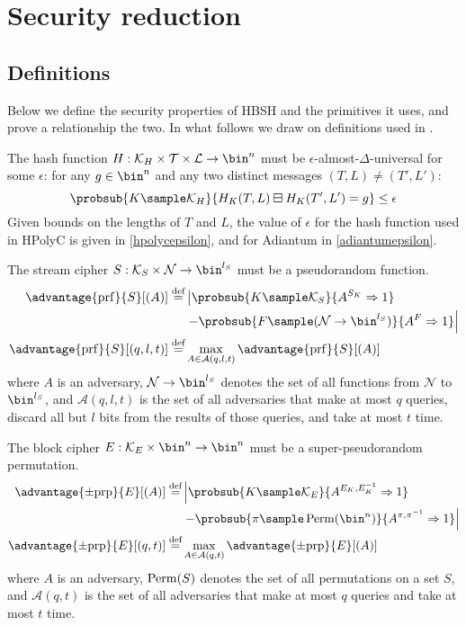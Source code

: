\documentclass[eprint.tex]{subfiles}
\begin{document}
\section{Security reduction}
\subsection{Definitions}
Below we define the security properties of HBSH and
the primitives it uses, and prove a relationship the two.
In what follows we draw on definitions used in \cite{hctr2}.

The hash function
$H: \mathcal{K}_H \times \mathcal{T} \times \mathcal{L} \rightarrow \bin^n$
must be $\epsilon$-almost-$\Delta$-universal\label{eadudef} for some $\epsilon$:
for any $g \in \bin^n$ and
any two distinct messages $(T, L) \neq (T', L')$:
%
\begin{displaymath}
\probsub{K \sample \mathcal{K}_H}{H_{K}(T, L) \boxminus H_{K}(T', L') = g} \leq \epsilon
\end{displaymath}
%
Given bounds on the lengths of $T$ and $L$, the value of $\epsilon$ for the
hash function used in HPolyC is given in \autoref{hpolycepsilon},
and for Adiantum in \autoref{adiantumepsilon}.

The stream cipher
$S: \mathcal{K}_S \times \mathcal{N} \rightarrow \bin^{l_S}$
must be a pseudorandom function.
%
\begin{align*}
    \advantage{\mathrm{prf}}{S}[(A)] \defeq
    &\left| \probsub{K \sample \mathcal{K}_S}{A^{S_{K}}\Rightarrow 1}\right.
    \\
    &\left. - \probsub{F \sample (\mathcal{N} \rightarrow \bin^{l_S})}
    {A^F\Rightarrow 1} \right|
    \\
    \advantage{\mathrm{prf}}{S}[(q, l, t)]
    \defeq &\max_{A \in \mathcal{A}(q, l, t)} \advantage{\mathrm{prf}}{S}[(A)]
\end{align*}
%
where $A$ is an adversary,
$\mathcal{N} \rightarrow \bin^{l_S}$ denotes the set of all
functions from $\mathcal{N}$ to $\bin^{l_S}$,
and
$\mathcal{A}(q, l, t)$
is the set of all adversaries that make at most $q$ queries, discard all but $l$ bits from
the results of those queries, and take at most $t$ time.

The block cipher
$E: \mathcal{K}_E \times \bin^n \rightarrow \bin^n$
must be a super-pseudorandom permutation.
%
\begin{align*}
    \advantage{\pm \mathrm{prp}}{E}[(A)] \defeq
    &\left|\probsub{K \sample \mathcal{K}_E}{A^{E_K,E_K^{-1}}\Rightarrow 1}\right.
    \\
    &\left. - \probsub{\pi \sample \Perm(\bin^n)}{A^{\pi,\pi^{-1}}\Rightarrow 1}\right|
    \\
    \advantage{\pm \mathrm{prp}}{E}[(q, t)] \defeq
    &\max_{A \in \mathcal{A}(q, t)} \advantage{\pm \mathrm{prp}}{E}[(A)]
\end{align*}
%
where $A$ is an adversary,
$\operatorname{Perm}(S)$ denotes the set of all permutations on a set $S$,
and
$\mathcal{A}(q, t)$
is the set of all adversaries that make at most $q$ queries and take at most $t$ time.
\end{document}
